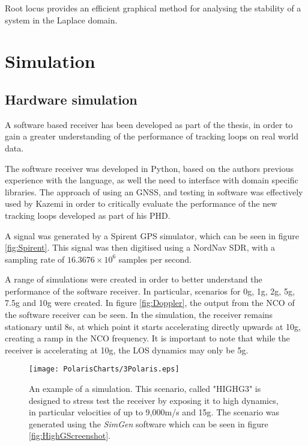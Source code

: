 Root locus provides an efficient graphical method for analysing the stability of a system in the Laplace domain\cite{Nise}. 


\begin{comment}
\begin{lstlisting}[frame=single]
Kvco =1;
Bn = 18;
a3 = 1.1;
b3 = 2.4;
omega = Bn/0.7845;
k1 = b3*omega;
k2 = a3*(omega^2);
k3 = omega^3;
%H is the forward transfer function
H = tf([Kvco*k1 Kvco*k2 Kvco*k3],[1 0 0 0]);
rlocus(H);
\end{lstlisting}
\end{comment}

\section{Simulation}

\subsection{Hardware simulation}
A software based receiver has been developed as part of the thesis, in order to gain a greater understanding of the performance of tracking loops on real world data. 

The software receiver was developed in Python, based on the authors previous experience with the language, as well the need to interface with domain specific libraries. 
The approach of using an \ac{GNSS}, and testing in software was effectively used by Kazemi \cite{KazemiPHD} in order to critically evaluate the performance of the new tracking loops developed as part of his PHD.

A signal was generated by a Spirent \ac{GPS} simulator, which can be seen in figure \ref{fig:Spirent}. This signal was then digitised using a NordNav \ac{SDR}, with a sampling rate of $16.3676 \times 10^6$ samples per second. 

A range of simulations were created in order to better understand the performance of the software receiver. In particular, scenarios for 0g, 1g, 2g, 5g, 7.5g and 10g were created. In figure \ref{fig:Doppler}, the output from the \ac{NCO} of the software receiver can be seen. In the simulation, the receiver remains stationary until 8s, at which point it starts accelerating directly upwards at 10g, creating a ramp in the \ac{NCO} frequency. It is important to note that while the receiver is accelerating at 10g, the \ac{LOS} dynamics may only be 5g. 

\begin{figure}[!htb] 
    \centering
    \texttt{[image: PolarisCharts/3Polaris.eps]} 
    \caption{An example of a simulation. This scenario, called  "HIGHG3" is designed to stress test the receiver by exposing it to high dynamics, in particular velocities of up to 9,000m/s and 15g. The scenario was generated using the \emph{SimGen} software which can be seen in figure \ref{fig:HighGScreenshot}.}
    \label{fig:Polaris3}
\end{figure}


